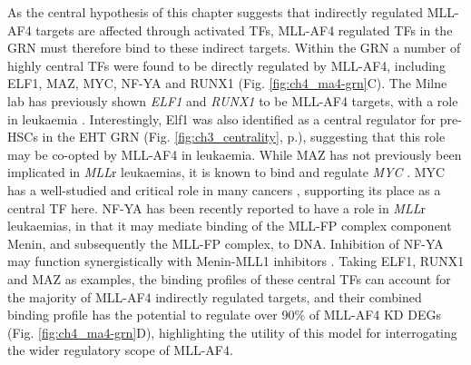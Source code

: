 As the central hypothesis of this chapter suggests that indirectly regulated MLL-AF4 targets are affected through activated TFs, MLL-AF4 regulated TFs in the GRN must therefore bind to these indirect targets. Within the GRN a number of highly central TFs were found to be directly regulated by MLL-AF4, including ELF1, MAZ, MYC, NF-YA and RUNX1 (Fig. \ref{fig:ch4_ma4-grn}C). The Milne lab has previously shown \textit{ELF1} and \textit{RUNX1} to be MLL-AF4 targets, with a role in leukaemia \citep{godfrey_dot1l_2019, wilkinson_runx1_2013}. Interestingly, Elf1 was also identified as a central regulator for pre-HSCs in the EHT GRN (Fig. \ref{fig:ch3_centrality}, p.\pageref{fig:ch3_centrality}), suggesting that this role may be co-opted by MLL-AF4 in leukaemia. While MAZ has not previously been implicated in \textit{MLL}r leukaemias, it is known to bind and regulate \textit{MYC} \citep{komatsu_maz_1997}. MYC has a well-studied and critical role in many cancers \citep{dang_myc_2012}, supporting its place as a central TF here. NF-YA has been recently reported to have a role in \textit{MLL}r leukaemias, in that it may mediate binding of the MLL-FP complex component Menin, and subsequently the MLL-FP complex, to DNA. Inhibition of NF-YA may function synergistically with Menin-MLL1 inhibitors \citep{soto-feliciano_molecular_2022}. Taking ELF1, RUNX1 and MAZ as examples, the binding profiles of these central TFs can account for the majority of MLL-AF4 indirectly regulated targets, and their combined binding profile has the potential to regulate over 90\% of MLL-AF4 KD DEGs (Fig. \ref{fig:ch4_ma4-grn}D), highlighting the utility of this model for interrogating the wider regulatory scope of MLL-AF4.

